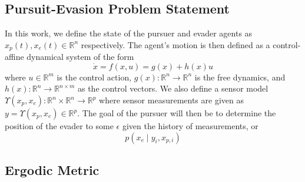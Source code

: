\documentclass[conference]{IEEEtran}
\begin{document}
\subsection{Pursuit-Evasion Problem Statement}

In this work, we define the state of the pursuer and evader agents as $x_p(t), x_e(t) \in \mathbb{R}^n$ respectively.
The agent's motion is then defined as a control-affine dynamical system of the form
\begin{equation}
\dot{x} = f(x,u) = g(x) + h(x)u
\end{equation}
where $u \in \mathbb{R}^m$ is the control action, $g(x) : \mathbb{R}^n \to \mathbb{R}^n$ is the free dynamics, and $h(x) : \mathbb{R}^n \to \mathbb{R}^{n \times m}$ as the control vectors. 
We also define a sensor model $\Upsilon(x_p, x_e): \mathbb{R}^n \times \mathbb{R}^n \to  \mathbb{R}^p$ where sensor measurements are given as $y = \Upsilon(x_p, x_e) \in \mathbb{R}^p$.
The goal of the pursuer will then be to determine the position of the evader to some $\epsilon$ given the history of measurements, or
\begin{equation}
p( x_e \mid y_i, x_{p,i}) 
\end{equation}





\subsection{Ergodic Metric}
\end{document}
